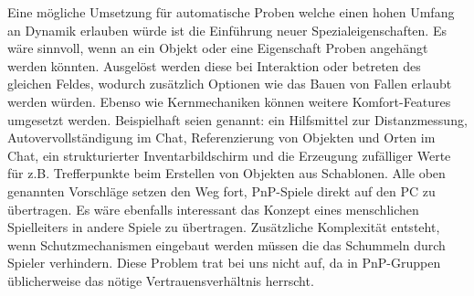 Eine mögliche Umsetzung für automatische Proben welche einen hohen Umfang an Dynamik erlauben würde ist die Einführung neuer Spezialeigenschaften. Es wäre sinnvoll, wenn an ein Objekt oder eine Eigenschaft Proben angehängt werden könnten. Ausgelöst werden diese bei Interaktion oder betreten des gleichen Feldes, wodurch zusätzlich Optionen wie das Bauen von Fallen erlaubt werden würden.\newline
Ebenso wie Kernmechaniken können weitere Komfort-Features umgesetzt werden. Beispielhaft seien genannt:
ein Hilfsmittel zur Distanzmessung,
Autovervollständigung im Chat,
Referenzierung von Objekten und Orten im Chat,
ein strukturierter Inventarbildschirm und
die Erzeugung zufälliger Werte für z.B. Trefferpunkte beim Erstellen von Objekten aus Schablonen.\newline
Alle oben genannten Vorschläge setzen den Weg fort, PnP-Spiele direkt auf den PC zu übertragen. Es wäre ebenfalls interessant das Konzept eines menschlichen Spielleiters in andere Spiele zu übertragen. Zusätzliche Komplexität entsteht, wenn Schutzmechanismen eingebaut werden müssen die das Schummeln durch Spieler verhindern. Diese Problem trat bei uns nicht auf, da in PnP-Gruppen üblicherweise das nötige Vertrauensverhältnis herrscht.